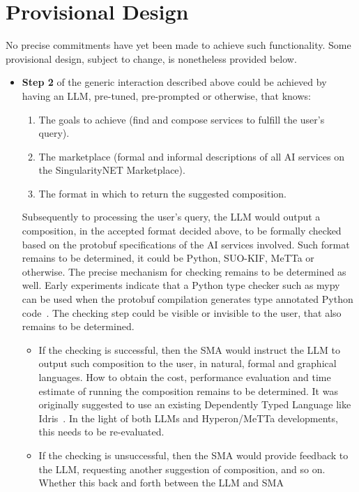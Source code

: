 \documentclass[]{article}
\begin{document}
\section{Provisional Design}
No precise commitments have yet been made to achieve such
functionality.  Some provisional design, subject to change, is
nonetheless provided below.
\begin{itemize}
\item \textbf{Step 2} of the generic interaction described above could
  be achieved by having an LLM, pre-tuned, pre-prompted or otherwise,
  that knows:
  \begin{enumerate}
  \item The goals to achieve (find and compose services to fulfill the
    user's query).
  \item The marketplace (formal and informal descriptions of all AI
    services on the SingularityNET Marketplace).
  \item The format in which to return the suggested composition.
  \end{enumerate}
  Subsequently to processing the user's query, the LLM would output a
  composition, in the accepted format decided above, to be formally
  checked based on the protobuf specifications of the AI services
  involved.  Such format remains to be determined, it could be Python,
  SUO-KIF, MeTTa or otherwise.  The precise mechanism for checking
  remains to be determined as well.  Early experiments indicate that a
  Python type checker such as mypy can be used when the protobuf
  compilation generates type annotated Python
  code~\cite{ProtobufCheckingXP2023}.  The checking step could be
  visible or invisible to the user, that also remains to be
  determined.
  \begin{itemize}
  \item If the checking is successful, then the SMA would instruct the
    LLM to output such composition to the user, in natural, formal and
    graphical languages.  How to obtain the cost, performance
    evaluation and time estimate of running the composition remains to
    be determined.  It was originally suggested to use an existing
    Dependently Typed Language like Idris~\cite{AIDSLReport2021}.  In
    the light of both LLMs and Hyperon/MeTTa developments, this needs
    to be re-evaluated.
  \item If the checking is unsuccessful, then the SMA would provide
    feedback to the LLM, requesting another suggestion of composition,
    and so on.  Whether this back and forth between the LLM and SMA

\end{itemize}
\end{itemize}
\end{document}
